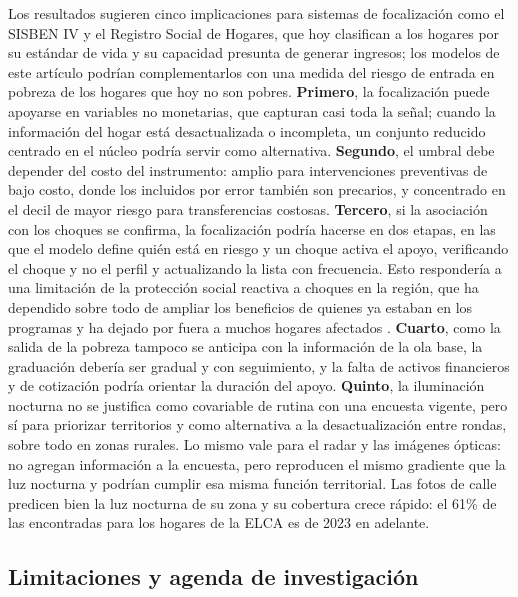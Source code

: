 \documentclass[12pt, letterpaper]{article}
\begin{document}
Los resultados sugieren cinco implicaciones para sistemas de focalización
como el SISBEN IV y el Registro Social de Hogares, que hoy clasifican a
los hogares por su estándar de vida y su capacidad presunta de generar
ingresos; los modelos de este artículo podrían complementarlos con una medida del riesgo de entrada en pobreza de
los hogares que hoy no son pobres. \textbf{Primero}, la focalización puede apoyarse en variables no
monetarias, que capturan casi toda la señal; cuando la información del
hogar está desactualizada o incompleta, un conjunto reducido centrado en
el núcleo podría servir como alternativa. \textbf{Segundo}, el umbral debe depender
del costo del instrumento: amplio para intervenciones preventivas de bajo
costo, donde los incluidos por error también son precarios, y concentrado
en el decil de mayor riesgo para transferencias costosas. \textbf{Tercero}, si la
asociación con los choques se confirma, la focalización podría hacerse en
dos etapas, en las que el modelo define
quién está en riesgo y un choque activa el apoyo, verificando el choque y
no el perfil y actualizando la lista con frecuencia. Esto respondería a una
limitación de la protección social reactiva a choques en la región, que ha
dependido sobre todo de ampliar los beneficios de quienes ya estaban en
los programas y ha dejado por fuera a muchos hogares afectados
\parencite{costella2023}. \textbf{Cuarto}, como la
salida de la pobreza tampoco se anticipa con la información de la ola
base, la graduación debería ser gradual y con seguimiento, y la falta de
activos financieros y de cotización podría orientar la duración del apoyo. \textbf{Quinto}, la iluminación
nocturna no se justifica como covariable de rutina con una encuesta
vigente, pero sí para priorizar territorios y como alternativa a la desactualización entre rondas,
sobre todo en zonas rurales. Lo mismo vale para el radar y las imágenes
ópticas: no agregan información a la encuesta, pero reproducen el mismo
gradiente que la luz nocturna y podrían cumplir esa misma función
territorial. Las fotos de calle predicen bien la luz nocturna de su zona y
su cobertura crece rápido: el 61\% de las encontradas para los hogares de
la ELCA es de 2023 en adelante.

\subsection{Limitaciones y agenda de investigación}
\label{subsec:limitaciones}
\end{document}
